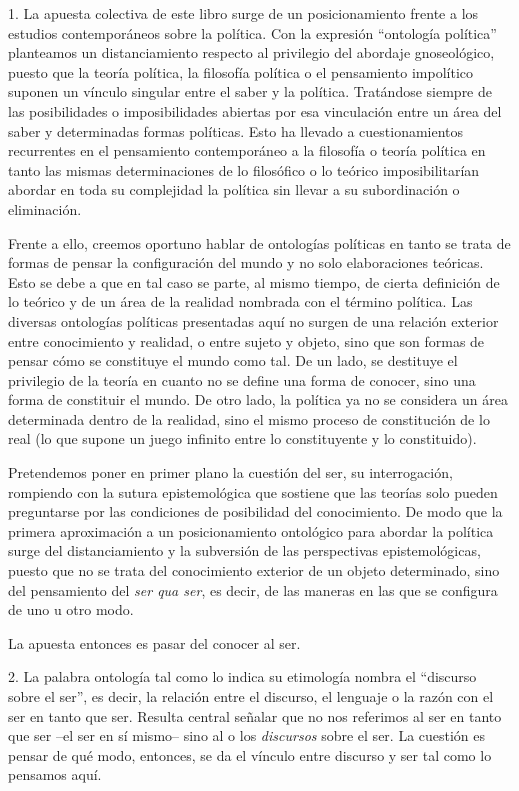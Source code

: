 \documentclass{book}
\begin{document}
1. La apuesta colectiva de este libro surge de un posicionamiento frente a
los estudios contemporáneos sobre la política. Con la expresión
\enquote{ontología política} planteamos un distanciamiento respecto al
privilegio del abordaje gnoseológico, puesto que la teoría política, la
filosofía política o el pensamiento impolítico suponen un vínculo
singular entre el saber y la política. Tratándose siempre de las
posibilidades o imposibilidades abiertas por esa vinculación entre un
área del saber y determinadas formas políticas. Esto ha llevado a
cuestionamientos recurrentes en el pensamiento contemporáneo a la
filosofía o teoría política en tanto las mismas determinaciones de lo
filosófico o lo teórico imposibilitarían abordar en toda su complejidad
la política sin llevar a su subordinación o eliminación.

Frente a ello, creemos oportuno hablar de ontologías políticas en tanto
se trata de formas de pensar la configuración del mundo y no solo
elaboraciones teóricas. Esto se debe a que en tal caso se parte, al
mismo tiempo, de cierta definición de lo teórico y de un área de la
realidad nombrada con el término política. Las diversas ontologías
políticas presentadas aquí no surgen de una relación exterior entre
conocimiento y realidad, o entre sujeto y objeto, sino que son formas de
pensar cómo se constituye el mundo como tal. De un lado, se destituye el
privilegio de la teoría en cuanto no se define una forma de conocer,
sino una forma de constituir el mundo. De otro lado, la política ya no
se considera un área determinada dentro de la realidad, sino el mismo
proceso de constitución de lo real (lo que supone un juego infinito
entre lo constituyente y lo constituido).

Pretendemos poner en primer plano la cuestión del ser, su interrogación,
rompiendo con la sutura epistemológica que sostiene que las teorías solo
pueden preguntarse por las condiciones de posibilidad del conocimiento.
De modo que la primera aproximación a un posicionamiento ontológico para
abordar la política surge del distanciamiento y la subversión de las
perspectivas epistemológicas, puesto que no se trata del conocimiento
exterior de un objeto determinado, sino del pensamiento del \emph{ser
qua ser}, es decir, de las maneras en las que se configura de uno u otro
modo.

La apuesta entonces es pasar del conocer al ser.

2. La palabra ontología tal como lo indica su etimología nombra el
\enquote{discurso sobre el ser}, es decir, la relación entre el discurso, el
lenguaje o la razón con el ser en tanto que ser. Resulta central señalar
que no nos referimos al ser en tanto que ser --el ser en sí mismo-- sino
al o los \emph{discursos} sobre el ser. La cuestión es pensar de qué
modo, entonces, se da el vínculo entre discurso y ser tal como lo
pensamos aquí.
\end{document}
